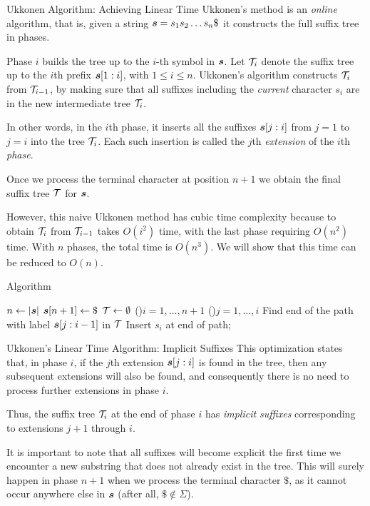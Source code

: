 \begin{frame}{Ukkonen Algorithm: Achieving Linear Time}
Ukkonen's method is an {\em online} algorithm, that is,
given a string $\bs = s_1s_2\ldots s_{n}\$$ it constructs the full
suff\/{i}x tree in phases. 

\medskip
Phase $i$ builds the tree up to the $i$-th symbol
in ${\boldsymbol s}$.
Let ${\mathcal T}_{i}$ denote the
suff\/{i}x tree up to the $i$th pref\/{i}x ${\boldsymbol s}[1:i]$, with $1 \le i \le
n$. Ukkonen's algorithm constructs ${\mathcal T}_i$ from
${\mathcal T}_{i-1}$, by making sure
that all suff\/{i}xes including the {\em current} character $s_{i}$ are in
the new intermediate tree ${\mathcal T}_{i}$. 

\medskip
In other words, in the $i$th
phase, it inserts all the suff\/{i}xes ${\boldsymbol s}[j:i]$ from $j=1$ to
$j=i$ into the tree ${\mathcal T}_{i}$. Each such insertion is called the $j$th
{\em extension} of the $i$th {\em phase}.

\medskip
Once we process the terminal
character at position $n+1$ we obtain the f\/{i}nal suff\/{i}x tree $\cT$
for ${\boldsymbol s}$.


\medskip
However, this naive Ukkonen method has cubic time complexity
because to obtain ${\mathcal T}_i$ from ${\mathcal T}_{i-1}$ takes $O(i^2)$ time,
with the last phase requiring $O(n^2)$ time. With
$n$ phases, the total time is $O(n^3)$.
We will show that this time can be reduced to $O(n)$.

\end{frame}


\begin{frame}[fragile]{Algorithm \algUkkonenSimple}
\begin{tightalgo}[H]{\textwidth-18pt}
 \AlgorithmU{}
$n \gets |{\boldsymbol s}|$\; $\bs[n+1] \gets \$$  
${\mathcal T} \leftarrow \emptyset$  
\ForEach(){$i=1,\ldots,n+1$}{
  \ForEach(){$j=1,\ldots,i$}{
    F{i}nd end of the path with label ${\boldsymbol s}[j:i-1]$ in $\cT$\;
    Insert $s_i$ at end of path;
  }
}
\Return{$\cT$}\;
\end{tightalgo}
\end{frame}

\begin{frame}{Ukkonen's Linear Time Algorithm: Implicit Suffixes}
This optimization states that, in phase
$i$, if the $j$th extension ${\boldsymbol s}[j:i]$ is found in the tree, then any
subsequent extensions will also be found, and consequently there is
no need to process further extensions in phase $i$.

\bigskip
Thus, the suff\/{i}x tree ${\mathcal T}_i$ at the end of phase $i$ has
{\em implicit suff\/{i}xes} corresponding to extensions
$j+1$ through $i$.

\bigskip
It is important to note that all suff\/{i}xes will
become explicit the f\/{i}rst
time we encounter a new substring that does not already exist in the
tree. This will surely happen in phase $n+1$ when
we process the terminal character
$\$$, as it cannot occur anywhere else in
${\boldsymbol s}$ (after all, $\$ \not\in \Sigma$).
\end{frame}




